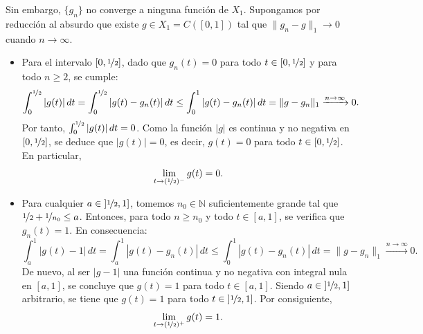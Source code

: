 \documentclass[12pt]{article}
\begin{document}
\begin{ejercicio}[2 puntos]
\begin{enumerate}[label=\alph*)]
                Sin embargo, $\{g_n\}$ no converge a ninguna función de $X_1$. Supongamos por reducción al absurdo que existe $g \in X_1 = C([0, 1])$ tal que $\|g_n - g\|_1 \to 0$ cuando $n \to \infty$. 
                \begin{itemize}
                    \item Para el intervalo $[0, \nicefrac{1}{2}]$, dado que $g_n(t) = 0$ para todo $t \in [0, \nicefrac{1}{2}]$ y para todo $n \ge 2$, se cumple:
                    \begin{equation*}
                        \int_0^{\nicefrac{1}{2}} |g(t)|\,dt = \int_0^{\nicefrac{1}{2}} |g(t) - g_n(t)|\,dt \le \int_0^1 |g(t) - g_n(t)|\,dt = \|g - g_n\|_1 \xrightarrow{n\to\infty} 0.
                    \end{equation*}
                    Por tanto, $\int_0^{\nicefrac{1}{2}} |g(t)|\,dt = 0$. Como la función $|g|$ es continua y no negativa en $[0, \nicefrac{1}{2}]$, se deduce que $|g(t)| = 0$, es decir, $g(t) = 0$ para todo $t \in [0, \nicefrac{1}{2}]$. En particular,
                    \begin{equation*}
                        \lim_{t \to (\nicefrac{1}{2})^-} g(t) = 0.
                    \end{equation*}

                    \item Para cualquier $a \in \left]\nicefrac{1}{2}, 1\right]$, tomemos $n_0 \in \mathbb{N}$ suficientemente grande tal que $\nicefrac{1}{2} + \nicefrac{1}{n_0} \le a$. Entonces, para todo $n \ge n_0$ y todo $t \in [a, 1]$, se verifica que $g_n(t) = 1$. En consecuencia:
                    \begin{equation*}
                        \int_a^1 |g(t) - 1|\,dt = \int_a^1 |g(t) - g_n(t)|\,dt \le \int_0^1 |g(t) - g_n(t)|\,dt = \|g - g_n\|_1 \xrightarrow{n\to\infty} 0.
                    \end{equation*}
                    De nuevo, al ser $|g - 1|$ una función continua y no negativa con integral nula en $[a, 1]$, se concluye que $g(t) = 1$ para todo $t \in [a, 1]$. Siendo $a \in \left]\nicefrac{1}{2}, 1\right]$ arbitrario, se tiene que $g(t) = 1$ para todo $t \in \left]\nicefrac{1}{2}, 1\right]$. Por consiguiente,
                    \begin{equation*}
                        \lim_{t \to (\nicefrac{1}{2})^+} g(t) = 1.
                    \end{equation*}
                \end{itemize}


\end{enumerate}
\end{ejercicio}
\end{document}
